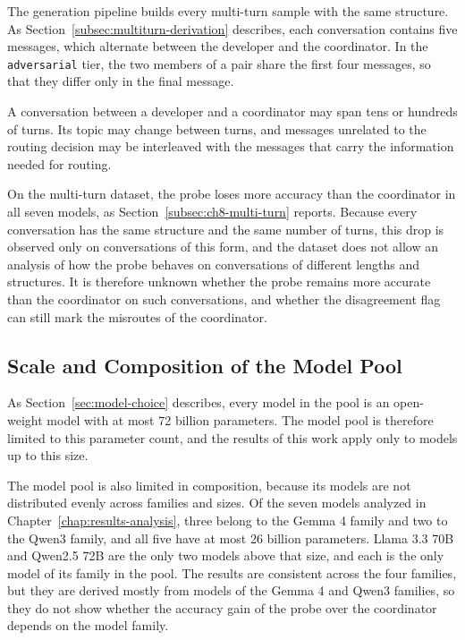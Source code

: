 The generation pipeline builds every multi-turn sample with the same structure. As Section~\ref{subsec:multiturn-derivation} describes, each conversation contains five messages, which alternate between the developer and the coordinator. In the \texttt{adversarial} tier, the two members of a pair share the first four messages, so that they differ only in the final message.

A conversation between a developer and a coordinator may span tens or hundreds of turns. Its topic may change between turns, and messages unrelated to the routing decision may be interleaved with the messages that carry the information needed for routing.

On the multi-turn dataset, the probe loses more accuracy than the coordinator in all seven models, as Section~\ref{subsec:ch8-multi-turn} reports. Because every conversation has the same structure and the same number of turns, this drop is observed only on conversations of this form, and the dataset does not allow an analysis of how the probe behaves on conversations of different lengths and structures. It is therefore unknown whether the probe remains more accurate than the coordinator on such conversations, and whether the disagreement flag can still mark the misroutes of the coordinator.

\subsection{Scale and Composition of the Model Pool}
\label{subsec:ch9-limitations-scale}

As Section~\ref{sec:model-choice} describes, every model in the pool is an open-weight model with at most 72 billion parameters. The model pool is therefore limited to this parameter count, and the results of this work apply only to models up to this size.

The model pool is also limited in composition, because its models are not distributed evenly across families and sizes. Of the seven models analyzed in Chapter~\ref{chap:results-analysis}, three belong to the Gemma 4 family and two to the Qwen3 family, and all five have at most 26 billion parameters. Llama 3.3 70B and Qwen2.5 72B are the only two models above that size, and each is the only model of its family in the pool. The results are consistent across the four families, but they are derived mostly from models of the Gemma 4 and Qwen3 families, so they do not show whether the accuracy gain of the probe over the coordinator depends on the model family.

